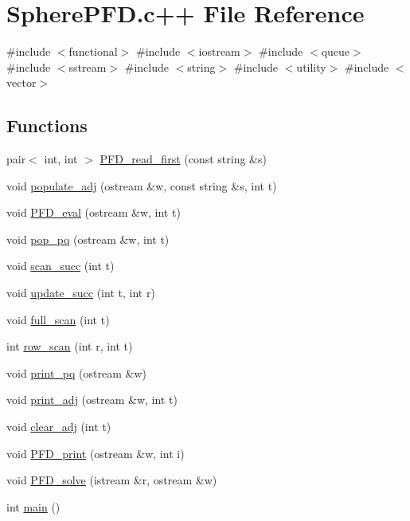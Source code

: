 \hypertarget{SpherePFD_8c_09_09}{\section{\-Sphere\-P\-F\-D.\-c++ \-File \-Reference}
\label{SpherePFD_8c_09_09}
}
{\ttfamily \#include $<$functional$>$}\*
{\ttfamily \#include $<$iostream$>$}\*
{\ttfamily \#include $<$queue$>$}\*
{\ttfamily \#include $<$sstream$>$}\*
{\ttfamily \#include $<$string$>$}\*
{\ttfamily \#include $<$utility$>$}\*
{\ttfamily \#include $<$vector$>$}\*
\subsection*{\-Functions}
\begin{DoxyCompactItemize}
\item 
pair$<$ int, int $>$ \hyperlink{SpherePFD_8c_09_09_aeeae70b11741d1153bec5371a9f2eb3f}{\-P\-F\-D\-\_\-read\-\_\-first} (const string \&s)
\item 
void \hyperlink{SpherePFD_8c_09_09_ae9be2b415f057d69ba790e8b77ba68f8}{populate\-\_\-adj} (ostream \&w, const string \&s, int t)
\item 
void \hyperlink{SpherePFD_8c_09_09_a0f3ab5d3d0c8e2daabc28ac86413aee7}{\-P\-F\-D\-\_\-eval} (ostream \&w, int t)
\item 
void \hyperlink{SpherePFD_8c_09_09_a7b524878900b6cc70510ffbbf1b215b2}{pop\-\_\-pq} (ostream \&w, int t)
\item 
void \hyperlink{SpherePFD_8c_09_09_a6db4aa174c52fd40ff95c15db4fe8ea2}{scan\-\_\-succ} (int t)
\item 
void \hyperlink{SpherePFD_8c_09_09_acc3c76d38b2635f3198c4579ed4c7cdc}{update\-\_\-succ} (int t, int r)
\item 
void \hyperlink{SpherePFD_8c_09_09_a2813c5892c655065c2b4caa39f3d33fb}{full\-\_\-scan} (int t)
\item 
int \hyperlink{SpherePFD_8c_09_09_a2cf9db34cf22c4986cef82cba813bcba}{row\-\_\-scan} (int r, int t)
\item 
void \hyperlink{SpherePFD_8c_09_09_ae2deab87c8dc607361a8ef7c7e61a2c8}{print\-\_\-pq} (ostream \&w)
\item 
void \hyperlink{SpherePFD_8c_09_09_a44e85580a9180b5e5fbb9efb240d784c}{print\-\_\-adj} (ostream \&w, int t)
\item 
void \hyperlink{SpherePFD_8c_09_09_a3ddcbebd407225ce57f7a7c41d477e24}{clear\-\_\-adj} (int t)
\item 
void \hyperlink{SpherePFD_8c_09_09_a832724a8a941400d9c4a7f1b69bcf6c8}{\-P\-F\-D\-\_\-print} (ostream \&w, int i)
\item 
void \hyperlink{SpherePFD_8c_09_09_ad1fb4f8285d98373eb99cc90453aa1df}{\-P\-F\-D\-\_\-solve} (istream \&r, ostream \&w)
\item 
int \hyperlink{SpherePFD_8c_09_09_ae66f6b31b5ad750f1fe042a706a4e3d4}{main} ()
\end{DoxyCompactItemize}
